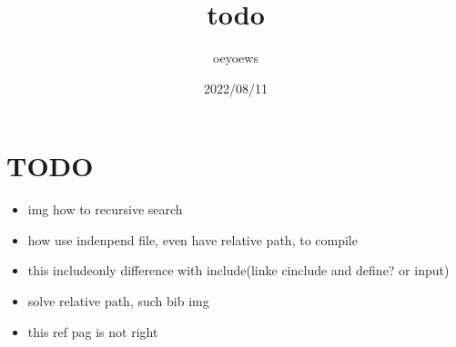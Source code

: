 \documentclass[UTF8]{article}
\title{todo \emoji{check-mark-button}}
\author{oeyoews}
\date{2022/08/11}
\begin{document}

\maketitle

\section{TODO }%
\label{sec:TODO}

\begin{itemize}
  \item img how to recursive search
  \item how use indenpend file, even have relative path, to compile
  \item this includeonly difference with include(linke cinclude and define? or
    input)
  \item solve relative path, such bib img
  \item this ref pag is not right
\end{itemize}
\end{document}
